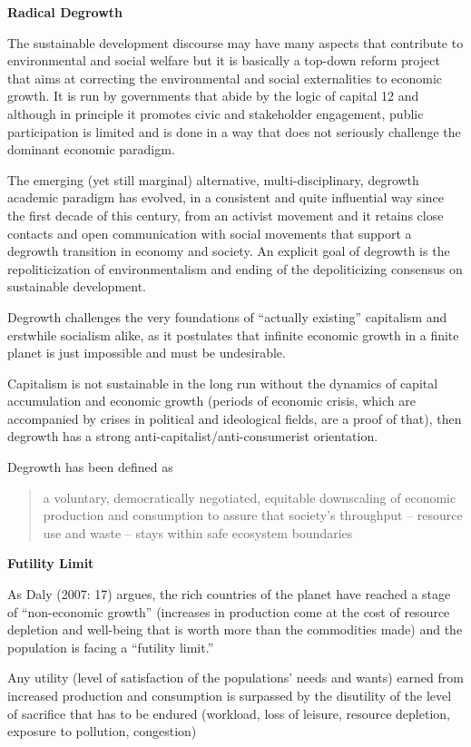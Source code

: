 \documentclass[
]{book}
\begin{document}
\textbf{Radical Degrowth}

The sustainable development discourse may have many aspects that contribute to environmental and
social welfare but it is basically a top-down reform project that aims at correcting the environmental and social
externalities to economic growth. It is run by governments that abide by the logic of capital 12 and although in
principle it promotes civic and stakeholder engagement, public participation is limited and is done in a way that
does not seriously challenge the dominant economic paradigm.

The emerging (yet still marginal) alternative, multi-disciplinary, degrowth
academic paradigm
has evolved, in a consistent and quite influential way since the first decade
of this century, from an activist movement and it retains close contacts and open communication with social
movements that support a degrowth transition in economy and society.
An explicit goal of degrowth is the
repoliticization of environmentalism and ending of the depoliticizing consensus on sustainable development.

Degrowth challenges the very foundations of ``actually existing'' capitalism and erstwhile
socialism alike, as it postulates that infinite economic growth in a finite planet is just impossible and must be
undesirable.

Capitalism is not sustainable in the long run without the dynamics of capital accumulation and
economic growth (periods of economic crisis, which are accompanied by crises in political and ideological
fields, are a proof of that), then degrowth has a strong anti-capitalist/anti-consumerist orientation.

Degrowth has been defined as

\begin{quote}
a voluntary, democratically negotiated, equitable downscaling of
economic production and consumption to assure that society's throughput -- resource use and waste -- stays within safe ecosystem boundaries
\end{quote}

\textbf{Futility Limit}

As Daly (2007: 17) argues, the rich
countries of the planet have reached a stage of ``non-economic growth'' (increases in production come at the
cost of resource depletion and well-being that is worth more than the commodities made) and the population is
facing a ``futility limit.''

Any utility (level of satisfaction of the populations' needs and wants) earned
from increased production and consumption is surpassed by the disutility of the level of sacrifice that has to be
endured (workload, loss of leisure, resource depletion, exposure to pollution, congestion)
\end{document}
